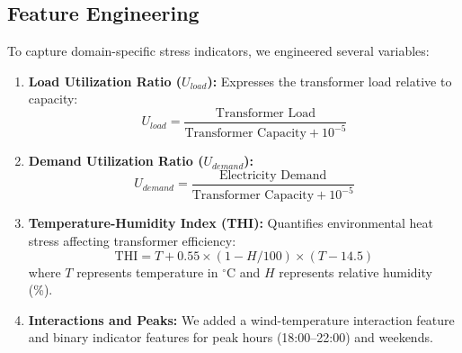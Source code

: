 \subsection{Feature Engineering}
To capture domain-specific stress indicators, we engineered several variables:
\begin{enumerate}
    \item \textbf{Load Utilization Ratio ($U_{load}$):} Expresses the transformer load relative to capacity:
    \begin{equation}
    U_{load} = \frac{\text{Transformer Load}}{\text{Transformer Capacity} + 10^{-5}}
    \end{equation}
    \item \textbf{Demand Utilization Ratio ($U_{demand}$):}
    \begin{equation}
    U_{demand} = \frac{\text{Electricity Demand}}{\text{Transformer Capacity} + 10^{-5}}
    \end{equation}
    \item \textbf{Temperature-Humidity Index (THI):} Quantifies environmental heat stress affecting transformer efficiency:
    \begin{equation}
    \text{THI} = T + 0.55 \times (1 - H/100) \times (T - 14.5)
    \end{equation}
    where $T$ represents temperature in $^{\circ}$C and $H$ represents relative humidity (\%).
    \item \textbf{Interactions and Peaks:} We added a wind-temperature interaction feature and binary indicator features for peak hours (18:00--22:00) and weekends.
\end{enumerate}

